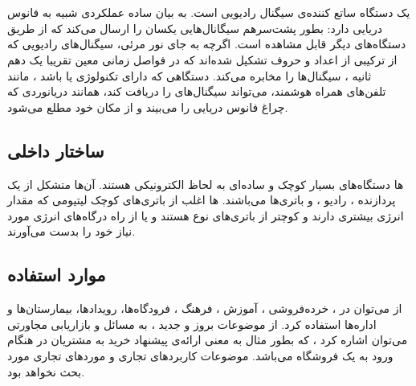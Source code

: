 \documentclass[oneside]{report}
\begin{document}
\section{{\normalsize {}}}
         {\normalsize {}} 
یک دستگاه ساتع کننده‌ی سیگنال رادیویی 
         {\normalsize {}} 
         است.
به بیان ساده 
         {\normalsize {}} 
         عملکردی شبیه به فانوس دریایی دارد: 
        بطور پشت‌سرهم سیگانال‌هایی یکسان را ارسال می‌کند که از طریق دستگاه‌های دیگر قابل مشاهده است. 
       اگرچه به جای نور مرئی، سیگنال‌های رادیویی که از ترکیبی از اعداد و حروف تشکیل شده‌اند که در فواصل زمانی معین تقریبا یک دهم ثانیه ، سیگنال‌ها را مخابره می‌کند. دستگاهی که دارای تکنولوژی 
                {\normalsize {}} 
    یا 
                        {\normalsize {}} 
      باشد ، مانند تلفن‌های همراه هوشمند، می‌تواند سیگنال‌های 
               {\normalsize {}} 
   را دریافت کند، همانند دریانوردی که چراغ فانوس دریایی را می‌بیند و از مکان خود مطلع می‌شود. 
   
 \subsection{ساختار داخلی {\small {}}}
		{\normalsize {}}ها 
		دستگاه‌های بسیار کوچک و ساده‌ای به لحاظ الکترونیکی هستند. آن‌ها متشکل از یک پردازنده ، رادیو ، و باتری‌ها می‌باشند.  
		{\normalsize {}}ها 
		اغلب از باتری‌های کوچک لیتیومی 
 که مقدار انرژی بیشتری دارند و کوچتر از باتری‌های نوع 
                {\normalsize {}} 
 هستند و یا از راه درگاه‌های 
                {\normalsize {}} 
 انرژی مورد نیاز خود را بدست می‌آورند. 
 
 \subsection{موارد استفاده}
 
 از 
                {\normalsize {}} 
                می‌توان  در  ، خرده‌فروشی ، آموزش ، فرهنگ ، فرودگاه‌ها، رویدادها، بیمارستان‌ها و اداره‌ها  استفاده کرد. از موضوعات بروز و جدید ، به مسائل  
                               {\normalsize {}} 
            و    بازاریابی مجاورتی
                می‌توان اشاره کرد‌ ، که بطور مثال به معنی ارائه‌ی  پیشنهاد خرید به مشتریان در هنگام ورود به یک فروشگاه می‌باشد. 
                موضوعات کاربردهای تجاری و  مورد‌های تجاری 
                {\normalsize {}} 
                مورد بحث نخواهد بود.
                
\end{document}

